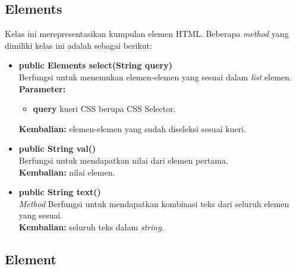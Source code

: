 \subsection{Elements}

Kelas ini merepresentasikan kumpulan elemen HTML. Beberapa \textit{method} yang dimiliki kelas ini adalah sebagai berikut:
\begin{itemize}
	\item \textbf{public Elements select(String query)} \\
		Berfungsi untuk menemukan elemen-elemen yang sesuai dalam \textit{list} elemen. \\
		\textbf{Parameter:} 
		\begin{itemize}
			\item \textbf{query} kueri CSS berupa CSS Selector.
		\end{itemize}
		\textbf{Kembalian:} elemen-elemen yang sudah diseleksi sesuai kueri.	
		
		\item \textbf{public String val()} \\
		Berfungsi untuk mendapatkan nilai dari elemen pertama. \\
		\textbf{Kembalian:} nilai elemen.	
		
		\item \textbf{public String text()} \\
		\textit{Method} Berfungsi untuk mendapatkan kombinasi teks dari seluruh elemen yang sesuai. \\
		\textbf{Kembalian:} seluruh teks dalam \textit{string}.	
\end{itemize}

\subsection{Element}

